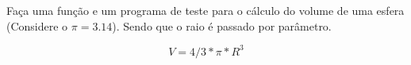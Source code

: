 
\question[10]

Faça uma função e um programa de teste para o cálculo do volume de uma esfera (Considere o $\pi=3.14$). Sendo que o raio é passado por parâmetro.

\begin{equation*}
	V = 4/3*\pi*R^3
\end{equation*}

